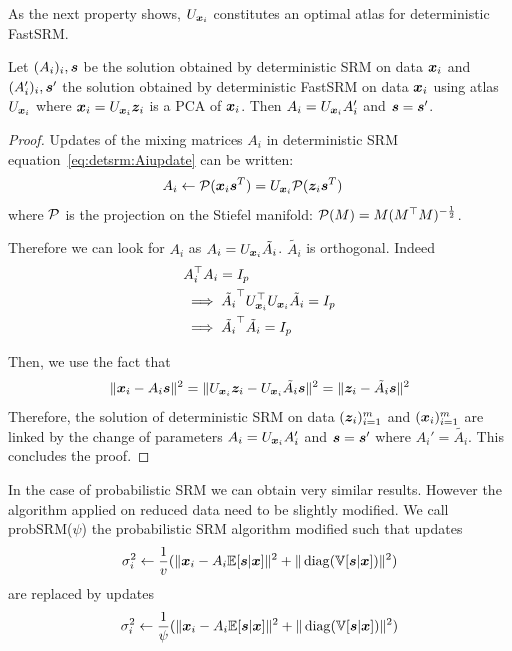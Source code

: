 As the next property shows, $U_{\boldsymbol{x}_i}$ constitutes an optimal atlas for deterministic FastSRM.
\begin{prop}
  Let $(A_i)_i, \boldsymbol{s}$ be the solution obtained by deterministic SRM on data
  $\boldsymbol{x}_i$ and $(A_i')_i, \boldsymbol{s}'$ the solution obtained by deterministic FastSRM on
  data $\boldsymbol{x}_i$ using atlas $U_{\boldsymbol{x}_i}$ where $\boldsymbol{x}_i = U_{\boldsymbol{x}_i} \boldsymbol{z}_i$ is a PCA
  of $\boldsymbol{x}_i$. Then $A_i = U_{\boldsymbol{x}_i}A_i'$ and $\boldsymbol{s} = \boldsymbol{s}'$. 
\label{prop:optimaldetsrm}
\end{prop}
\begin{proof}
Updates of the mixing matrices $A_i$ in deterministic SRM
equation~\eqref{eq:detsrm:Aiupdate} can be written:
\begin{align}
  A_i &\leftarrow \mathcal{P}(\boldsymbol{x}_i \boldsymbol{s}^T)= U_{\boldsymbol{x}_i}\mathcal{P}(\boldsymbol{z}_i \boldsymbol{s}^T)
  \label{eq:fastdetsrm:Aiupdate}
\end{align}
where $\mathcal{P}$ is the projection on the Stiefel manifold: $\mathcal{P}(M) = M
(M^{\top}M)^{-\frac12}$.


Therefore we can look for $A_i$ as $A_i = U_{\boldsymbol{x}_i} \tilde{A_i}$. $\tilde{A_i}$ is
orthogonal. Indeed
\begin{align}
  &A_i^{\top} A_i = I_p \\
  & \implies \tilde{A_i}^{\top}U_{\boldsymbol{x}_i}^{\top} U_{\boldsymbol{x}_i} \tilde{A_i} = I_p \\
  & \implies \tilde{A_i}^{\top} \tilde{A_i} = I_p
\end{align}

Then, we use the fact that
\begin{align}
  \|\boldsymbol{x}_i - A_i \boldsymbol{s} \|^2 = \| U_{\boldsymbol{x}_i}\boldsymbol{z}_i - U_{\boldsymbol{x}_i}\tilde{A_i} \boldsymbol{s}\|^2 = \| \boldsymbol{z}_i - \tilde{A_i} \boldsymbol{s} \|^2
  \label{eq:equality:xy}
\end{align}
Therefore, the solution of deterministic SRM on data $(\boldsymbol{z}_i)_{i=1}^m$ and
$(\boldsymbol{x}_i)_{i=1}^m$ are linked by the change of parameters $A_i = U_{\boldsymbol{x}_i}A_i'$ and
$\boldsymbol{s} = \boldsymbol{s}'$ where $A_i' = \tilde{A_i}$. This concludes the proof.
\end{proof}

In the case of probabilistic SRM we can obtain very similar results. However the
algorithm applied on reduced data need to be slightly modified.
We call probSRM($\psi$) the probabilistic SRM algorithm modified such that
updates
\begin{align}
\sigma_i^2 \leftarrow \frac1{v} (\| \boldsymbol{x}_i - A_i \mathbb{E}[\boldsymbol{s}|\boldsymbol{x}]\|^2 + \| \operatorname*{diag}(\mathbb{V}[\boldsymbol{s} | \boldsymbol{x}]) \|^2)
\end{align}
are replaced by updates
\begin{align}
  \sigma_i^2 \leftarrow \frac1{\psi} (\| \boldsymbol{x}_i - A_i \mathbb{E}[\boldsymbol{s}|\boldsymbol{x}]\|^2 + \| \operatorname*{diag}(\mathbb{V}[\boldsymbol{s} | \boldsymbol{x}]) \|^2)
\end{align}

